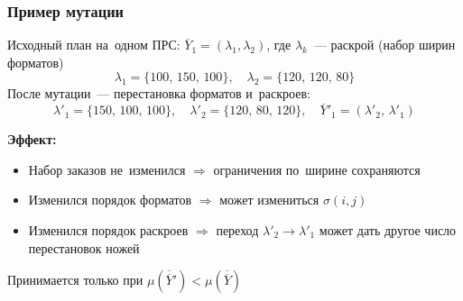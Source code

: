 \begin{frame}
    \frametitle{Пример мутации}
    \small
    Исходный план на~одном ПРС: $\overline{Y}_1=(\lambda_1,\lambda_2)$, где $\lambda_k$~--- раскрой (набор ширин форматов)
    \[
    \lambda_1=\{100,\,150,\,100\},\quad \lambda_2=\{120,\,120,\,80\}
    \]
    После мутации~--- перестановка форматов и~раскроев:
    \[
    \lambda'_1=\{150,\,100,\,100\},\quad \lambda'_2=\{120,\,80,\,120\},\quad \overline{Y}'_1=(\lambda'_2,\,\lambda'_1)
    \]

    \vspace{0.2cm}
    \textbf{Эффект:}
    \begin{itemize}
        \item Набор заказов не~изменился $\Rightarrow$ ограничения по~ширине сохраняются
        \item Изменился порядок форматов $\Rightarrow$ может измениться $\sigma(i,j)$
        \item Изменился порядок раскроев $\Rightarrow$ переход $\lambda'_2\to\lambda'_1$ может дать другое число перестановок ножей
    \end{itemize}
    Принимается только при $\mu(\overline{\overline{Y}}')<\mu(\overline{\overline{Y}})$
\end{frame}
